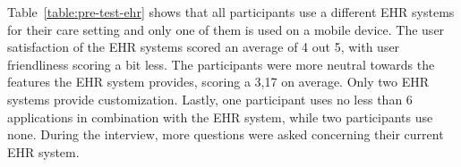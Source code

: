     Table~\ref{table:pre-test-ehr} shows that all participants use a different EHR systems for their care setting and only one of them is used on a mobile device. The user satisfaction of the EHR systems scored an average of 4 out 5, with user friendliness scoring a bit less. The participants were more neutral towards the features the EHR system provides, scoring a 3,17 on average. Only two EHR systems provide customization. Lastly, one participant uses no less than 6 applications in combination with the EHR system, while two participants use none. During the interview, more questions were asked concerning their current EHR system.

    \begin{table}[!t]
\end{table}
